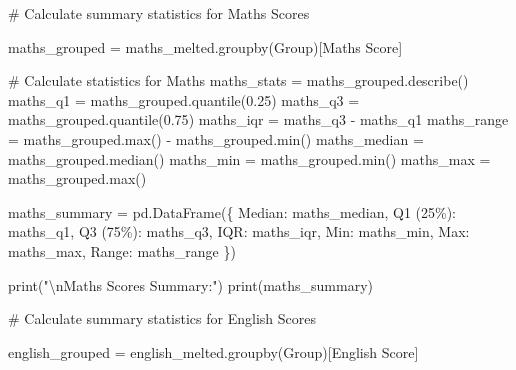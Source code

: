 \documentclass[
  letterpaper,
  DIV=11,
  numbers=noendperiod]{scrartcl}
\newenvironment{Shaded}{\begin{snugshade}}{\end{snugshade}}
\newcommand{\BuiltInTok}[1]{\textcolor[rgb]{0.00,0.23,0.31}{#1}}
\newcommand{\CharTok}[1]{\textcolor[rgb]{0.13,0.47,0.30}{#1}}
\newcommand{\CommentTok}[1]{\textcolor[rgb]{0.37,0.37,0.37}{#1}}
\newcommand{\FloatTok}[1]{\textcolor[rgb]{0.68,0.00,0.00}{#1}}
\newcommand{\NormalTok}[1]{\textcolor[rgb]{0.00,0.23,0.31}{#1}}
\newcommand{\OperatorTok}[1]{\textcolor[rgb]{0.37,0.37,0.37}{#1}}
\newcommand{\StringTok}[1]{\textcolor[rgb]{0.13,0.47,0.30}{#1}}
\begin{document}
\begin{Shaded}
\begin{Highlighting}[]
\CommentTok{\# Calculate summary statistics for Maths Scores}

\NormalTok{maths\_grouped }\OperatorTok{=}\NormalTok{ maths\_melted.groupby(}\StringTok{\textquotesingle{}Group\textquotesingle{}}\NormalTok{)[}\StringTok{\textquotesingle{}Maths Score\textquotesingle{}}\NormalTok{]}

\CommentTok{\# Calculate statistics for Maths}
\NormalTok{maths\_stats }\OperatorTok{=}\NormalTok{ maths\_grouped.describe()}
\NormalTok{maths\_q1 }\OperatorTok{=}\NormalTok{ maths\_grouped.quantile(}\FloatTok{0.25}\NormalTok{)}
\NormalTok{maths\_q3 }\OperatorTok{=}\NormalTok{ maths\_grouped.quantile(}\FloatTok{0.75}\NormalTok{)}
\NormalTok{maths\_iqr }\OperatorTok{=}\NormalTok{ maths\_q3 }\OperatorTok{{-}}\NormalTok{ maths\_q1}
\NormalTok{maths\_range }\OperatorTok{=}\NormalTok{ maths\_grouped.}\BuiltInTok{max}\NormalTok{() }\OperatorTok{{-}}\NormalTok{ maths\_grouped.}\BuiltInTok{min}\NormalTok{()}
\NormalTok{maths\_median }\OperatorTok{=}\NormalTok{ maths\_grouped.median()}
\NormalTok{maths\_min }\OperatorTok{=}\NormalTok{ maths\_grouped.}\BuiltInTok{min}\NormalTok{()}
\NormalTok{maths\_max }\OperatorTok{=}\NormalTok{ maths\_grouped.}\BuiltInTok{max}\NormalTok{()}


\NormalTok{maths\_summary }\OperatorTok{=}\NormalTok{ pd.DataFrame(\{}
    \StringTok{\textquotesingle{}Median\textquotesingle{}}\NormalTok{: maths\_median,}
    \StringTok{\textquotesingle{}Q1 (25\%)\textquotesingle{}}\NormalTok{: maths\_q1,}
    \StringTok{\textquotesingle{}Q3 (75\%)\textquotesingle{}}\NormalTok{: maths\_q3,}
    \StringTok{\textquotesingle{}IQR\textquotesingle{}}\NormalTok{: maths\_iqr,}
    \StringTok{\textquotesingle{}Min\textquotesingle{}}\NormalTok{: maths\_min,}
    \StringTok{\textquotesingle{}Max\textquotesingle{}}\NormalTok{: maths\_max,}
    \StringTok{\textquotesingle{}Range\textquotesingle{}}\NormalTok{: maths\_range}
\NormalTok{\})}


\BuiltInTok{print}\NormalTok{(}\StringTok{"}\CharTok{\textbackslash{}n}\StringTok{Maths Scores Summary:"}\NormalTok{)}
\BuiltInTok{print}\NormalTok{(maths\_summary)}


\CommentTok{\# Calculate summary statistics for English Scores}


\NormalTok{english\_grouped }\OperatorTok{=}\NormalTok{ english\_melted.groupby(}\StringTok{\textquotesingle{}Group\textquotesingle{}}\NormalTok{)[}\StringTok{\textquotesingle{}English Score\textquotesingle{}}\NormalTok{]}


\end{Highlighting}
\end{Shaded}
\end{document}
